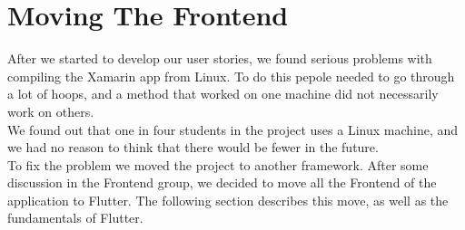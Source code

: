 \section{Moving The Frontend}

After we started to develop our user stories, we found serious problems with compiling the Xamarin app from Linux. To do this pepole needed to go through a lot of hoops, and a method that worked on one machine did not necessarily work on others.\\
We found out that one in four students in the project uses a Linux machine, and we had no reason to think that there would be fewer in the future.\\
To fix the problem we moved the project to another framework. After some discussion in the Frontend group, we decided to move all the Frontend of the application to Flutter. The following section describes this move, as well as the fundamentals of Flutter. 



